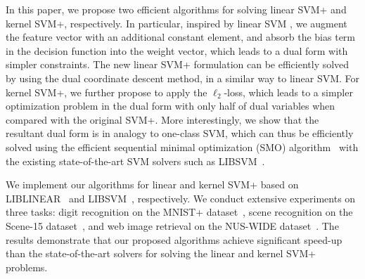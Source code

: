 In this paper, we propose two efficient algorithms for solving linear
SVM+ and kernel SVM+, respectively. In particular, inspired by linear
SVM \cite{DCD_linearsvm}, we augment the feature vector with an
additional constant element, and absorb the bias term in the decision
function into the weight vector, which leads to a dual form with
simpler constraints. The new linear SVM+ formulation can be
efficiently solved by using the dual coordinate descent method, in a
similar way to linear SVM. For kernel SVM+, we further propose to
apply the $\ell_2$-loss, which leads to a simpler optimization problem
in the dual form with only half of dual variables when compared with
the original SVM+. More interestingly, we show that the resultant dual
form is in analogy to one-class SVM, which can thus be efficiently
solved using the efficient sequential minimal optimization (SMO)
algorithm~\cite{Platt98sequentialminimal} with the existing
state-of-the-art SVM solvers such as
LIBSVM~\cite{svm_workingset,libsvm}.

We implement our algorithms for linear and kernel SVM+ based on
LIBLINEAR~\cite{liblinear} and LIBSVM~\cite{libsvm}, respectively. We
conduct extensive experiments on three tasks: digit recognition on the
MNIST+ dataset~\cite{SVMplus_vapnik}, scene recognition on the
Scene-15 dataset~\cite{scene-15}, and web image retrieval on the
NUS-WIDE dataset~\cite{NUSWIDE}. The results demonstrate that our
proposed algorithms achieve significant speed-up than the
state-of-the-art solvers for solving the linear and kernel SVM+
problems.


